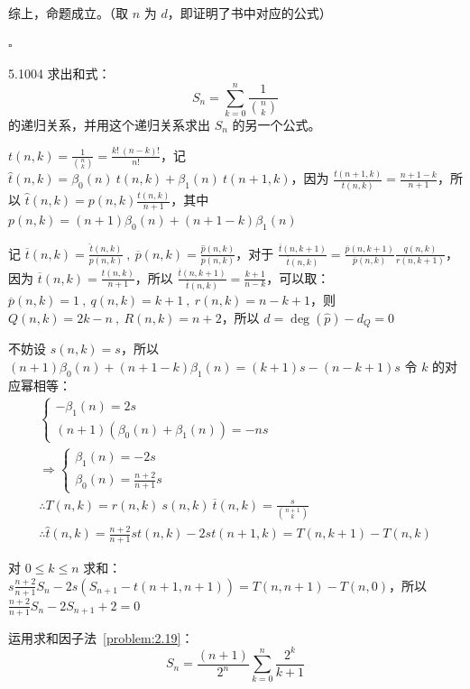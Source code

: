 综上，命题成立。（取 \( n \) 为 \( d \)，即证明了书中对应的公式）

\hfill \( \square \)

\begin{problem}{5.100}{4}
  求出和式：
  \[
    S_n = \sum_{k=0}^n \frac{1}{\binom{n}{k}}
  \]
  的递归关系，并用这个递归关系求出 \( S_n \) 的另一个公式。
\end{problem}

\( t(n,k) = \frac{1}{\binom{n}{k}} = \frac{k! \ (n-k)!}{n!} \)，记 \( \hat{t}(n,k) = \beta_0(n) \ t(n,k) + \beta_1(n) \ t(n+1,k) \)，因为 \( \frac{t(n+1,k)}{t(n,k)} = \frac{n+1-k}{n+1} \)，所以 \( \hat{t}(n,k) = p(n,k) \frac{t(n,k)}{n+1} \)，其中 \( p(n,k) = (n+1) \beta_0(n) + (n+1-k) \beta_1 (n) \)

记 \( \overline{t}(n,k) = \frac{\hat{t}(n,k)}{p(n,k)} \ , \ \overline{p}(n,k) = \frac{\hat{p}(n,k)}{p(n,k)} \)，对于 \( \frac{\overline{t}(n,k+1)}{\overline{t}(n,k)} = \frac{\overline{p}(n,k+1)}{\overline{p}(n,k)} \frac{q(n,k)}{r(n,k+1)} \)，因为 \( \overline{t}(n,k) = \frac{t(n,k)}{n+1} \)，所以 \( \frac{\overline{t}(n,k+1)}{\overline{t}(n,k)} = \frac{k+1}{n-k} \)，可以取：\( \overline{p}(n,k) = 1 \ , \ q(n,k) = k+1 \ , \ r(n,k) = n-k+1 \)，则 \( Q(n,k) = 2k-n \ , \ R(n,k) = n+2 \)，所以 \( d = \deg{(\hat{p})} - d_Q = 0 \)

不妨设 \( s(n,k) = s \)，所以 \( (n+1)\beta_0(n) + (n+1-k) \beta_1(n) = (k+1) s - (n-k+1)s \)
令 \( k \) 的对应幂相等：
\begin{gather*}
  \begin{cases}
    -\beta_1(n) = 2s \\
    (n+1) \left( \beta_0(n) + \beta_1(n) \right) = -ns
  \end{cases} \\
  \Rightarrow
  \begin{cases}
    \beta_1(n) = -2s \\
    \beta_0(n) = \frac{n+2}{n+1}s
  \end{cases} \\
  \therefore T(n,k) = r(n,k) \ s(n,k) \ \overline{t}(n,k) = \frac{s}{\binom{n+1}{k}} \\
  \therefore \hat{t} (n,k) = \frac{n+2}{n+1} s t(n,k) - 2s t(n+1,k) = T(n,k+1) - T(n,k)
\end{gather*}

对 \( 0 \le k \le n \) 求和：\( s \frac{n+2}{n+1} S_n - 2s(S_{n+1} - t(n+1,n+1)) = T(n,n+1) - T(n,0) \)，所以 \( \frac{n+2}{n+1} S_n - 2 S_{n+1} + 2 = 0 \)

运用求和因子法~\ref{problem:2.19}：
\[
  S_n = \frac{(n+1)}{2^n} \sum_{k=0}^n \frac{2^k}{k+1}
\]
